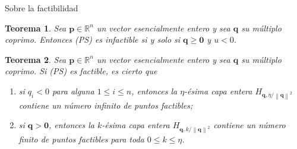 \documentclass[aspectratio=169]{beamer}
\newtheorem{stheorem}{Teorema}
\theoremstyle{definition}
\newcommand{\R}{\mathbb{R}}
\newcommand{\norm}[1]{\left\lVert #1 \right\rVert}
\renewcommand{\vec}[1]{\boldsymbol{#1}}
\newcommand{\clayer}[2]{H_{#1, #2}}
\newcommand{\qlayer}[2]{\clayer{\vec{#1}}{#2/\norm{\vec{#1}}^{2}}}
\begin{document}
\begin{frame}{Sobre la factibilidad}
	\begin{stheorem}
		Sea $\vec{p} \in \R^n$ un vector esencialmente entero y sea $\vec{q}$ su múltiplo coprimo.
		Entonces (PS) es infactible si y solo si $\vec{q} \geq \vec{0}$ y $u < 0$.
	\end{stheorem}

	\begin{stheorem}
		Sea $\vec{p} \in \R^n$ un vector esencialmente entero y sea $\vec{q}$ su múltiplo coprimo.
		Si (PS) es factible, es cierto que
		\begin{enumerate}
			\item si $q_i < 0$ para alguna $1 \leq i \leq n$, entonces la $\eta$-ésima
				capa entera $\qlayer{q}{\eta}$ contiene un número infinito de puntos factibles;
			\item si $\vec{q} > \vec{0}$, entonces la $k$-ésima capa entera $\qlayer{q}{k}$ contiene
				un número finito de puntos factibles para toda $0 \leq k \leq \eta$.
		\end{enumerate}
	\end{stheorem}
\end{frame}
\end{document}
